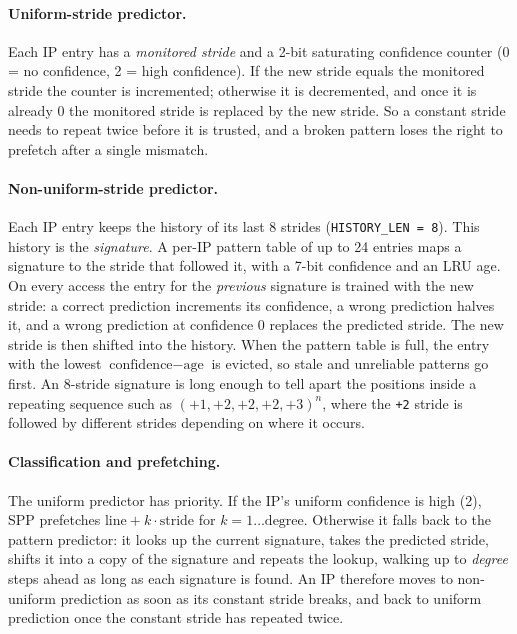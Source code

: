 \documentclass[11pt]{article}
\begin{document}
\paragraph{Uniform-stride predictor.}
Each IP entry has a \emph{monitored stride} and a 2-bit saturating confidence
counter (0 = no confidence, 2 = high confidence). If the new stride equals the
monitored stride the counter is incremented; otherwise it is decremented, and
once it is already 0 the monitored stride is replaced by the new stride. So a
constant stride needs to repeat twice before it is trusted, and a broken pattern
loses the right to prefetch after a single mismatch.

\paragraph{Non-uniform-stride predictor.}
Each IP entry keeps the history of its last 8 strides
(\texttt{HISTORY\_LEN = 8}). This history is the \emph{signature}. A per-IP
pattern table of up to 24 entries maps a signature to the stride that followed
it, with a 7-bit confidence and an LRU age. On every access the entry for the
\emph{previous} signature is trained with the new stride: a correct prediction
increments its confidence, a wrong prediction halves it, and a wrong prediction
at confidence 0 replaces the predicted stride. The new stride is then shifted
into the history. When the pattern table is full, the entry with the lowest
$\text{confidence} - \text{age}$ is evicted, so stale and unreliable patterns
go first. An 8-stride signature is long enough to tell apart the positions
inside a repeating sequence such as $(+1,+2,+2,+2,+3)^n$, where the
\texttt{+2} stride is followed by different strides depending on where it occurs.

\paragraph{Classification and prefetching.}
The uniform predictor has priority. If the IP's uniform confidence is high (2),
SPP prefetches $\text{line} + k \cdot \text{stride}$ for
$k = 1 \ldots \text{degree}$. Otherwise it falls back to the pattern
predictor: it looks up the current signature, takes the predicted stride, shifts
it into a copy of the signature and repeats the lookup, walking up to
\emph{degree} steps ahead as long as each signature is found. An IP therefore
moves to non-uniform prediction as soon as its constant stride breaks, and back
to uniform prediction once the constant stride has repeated twice.
\end{document}

